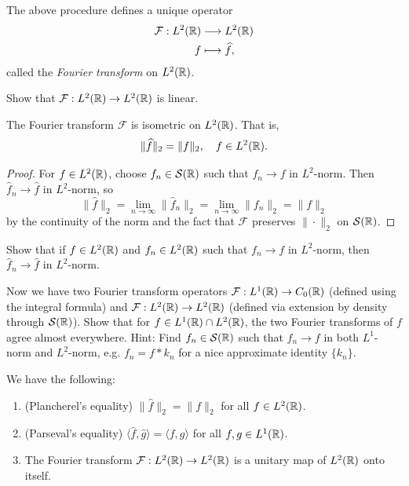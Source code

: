 \begin{definition}
  The above procedure defines a unique operator
  \begin{align*}
    \mathcal{F} : L^2(\mathbb{R}) &\longrightarrow L^2(\mathbb{R}) \\
    f &\longmapsto \widehat{f},
  \end{align*}
  called the \emph{Fourier transform} on $L^2(\mathbb{R})$.
\end{definition}

\begin{exercise}
  Show that $\mathcal{F} : L^2(\mathbb{R}) \to L^2(\mathbb{R})$
  is linear.
\end{exercise}

\begin{theorem}\label{thm:isometric}
  The Fourier transform
  $\mathcal{F}$ is isometric on $L^2(\mathbb{R})$. That is,
  \[\|\widehat{f}\|_2 = \|f\|_2, \quad f \in L^2(\mathbb{R}).\]
\end{theorem}

\begin{proof}
  For $f \in L^2(\mathbb{R})$, choose $f_n \in \mathcal{S}(\mathbb{R})$
  such that $f_n \to f$ in $L^2$-norm. Then
  $\widehat{f}_n \to \widehat{f}$ in $L^2$-norm, so
  \[
    \|\widehat{f}\|_2
    = \lim_{n \to \infty} \|\widehat{f}_n\|_2
    = \lim_{n \to \infty} \|f_n\|_2
    = \|f\|_2
  \]
  by the continuity of the norm and the
  fact that $\mathcal{F}$ preserves $\|\cdot\|_2$ on
  $\mathcal{S}(\mathbb{R})$.
\end{proof}

\begin{exercise}
  Show that if $f \in L^2(\mathbb{R})$ and
  $f_n \in L^2(\mathbb{R})$ such that
  $f_n \to f$ in $L^2$-norm, then
  $\widehat{f}_n \to \widehat{f}$
  in $L^2$-norm.
\end{exercise}

\begin{exercise}
  Now we have two Fourier transform
  operators $\mathcal{F} : L^1(\mathbb{R}) \to C_0(\mathbb{R})$
  (defined using the integral formula)
  and $\mathcal{F} : L^2(\mathbb{R}) \to L^2(\mathbb{R})$
  (defined via extension by density
  through $\mathcal{S}(\mathbb{R})$). Show
  that for $f \in L^1(\mathbb{R}) \cap L^2(\mathbb{R})$,
  the two Fourier transforms of $f$
  agree almost everywhere. Hint: Find
  $f_n \in \mathcal{S}(\mathbb{R})$ such that
  $f_n \to f$ in both $L^1$-norm and $L^2$-norm, e.g.
  $f_n = f * k_n$ for a nice approximate identity
  $\{k_n\}$.
\end{exercise}

\begin{theorem}\label{thm:l2-fourier-summary}
  We have the following:
  \begin{enumerate}
    \item (Plancherel's equality)
      $\|\widehat{f}\|_2 = \|f\|_2$ for all
      $f \in L^2(\mathbb{R})$.
    \item (Parseval's equality)
      $\langle \widehat{f}, \widehat{g} \rangle = \langle f, g \rangle$
      for all $f, g \in L^1(\mathbb{R})$.
    \item The Fourier transform
      $\mathcal{F} : L^2(\mathbb{R}) \to L^2(\mathbb{R})$ is a unitary
      map of $L^2(\mathbb{R})$ onto itself.
  \end{enumerate}
\end{theorem}


